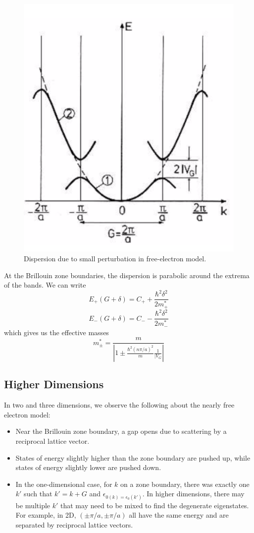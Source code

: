 \documentclass[10pt]{article}
\begin{document}
\begin{figure}
  \centering
    \includegraphics[width=\textwidth]{tb7}
    \caption{Dispersion due to small perturbation in free-electron model.}
\end{figure}
At the Brillouin zone boundaries, the dispersion is parabolic around the extrema of the bands. We can write
$$
E_{+}(G+\delta) = C_{+} + \frac{\hbar^{2}\delta^{2}}{2m^{*}_{+}}
$$
$$
E_{-}(G+\delta) = C_{-} - \frac{\hbar^{2}\delta^{2}}{2m^{*}_{-}}
$$
which gives us the effective masses
$$
m^{*}_{\pm} = \frac{m}{\left |1 \pm \frac{\hbar^{2}(n\pi/a)^{2}}{m}\frac{1}{|V_{G}} \right |}
$$

\subsection{Higher Dimensions}
In two and three dimensions, we observe the following about the nearly free electron model:
\begin{itemize}
  \item Near the Brillouin zone boundary, a gap opens due to scattering by a reciprocal lattice vector.
  \item States of energy slightly higher than the zone boundary are pushed up, while states of energy slightly
  lower are pushed down.
  \item In the one-dimensional case, for $k$ on a zone boundary, there was exactly one $k'$ such that $k' = k + G$
  and $\epsilon_{0(k) = \epsilon_{0}(k')}$. In higher dimensions, there may be multiple $k'$ that may need to be mixed
  to find the degenerate eigenstates. For example, in 2D, $(\pm \pi/a, \pm \pi/a)$ all have the same energy and are separated
  by reciprocal lattice vectors.
\end{itemize}
\end{document}
